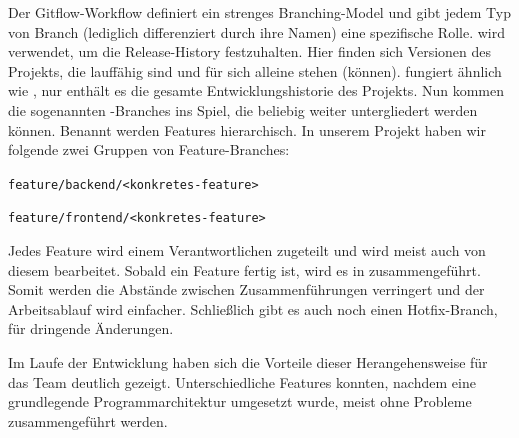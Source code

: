 Der Gitflow-Workflow definiert ein strenges Branching-Model und gibt jedem Typ von Branch (lediglich differenziert durch ihre Namen) eine spezifische Rolle.  wird verwendet, um die Release-History festzuhalten. Hier finden sich Versionen des Projekts, die lauffähig sind und für sich alleine stehen (können).  fungiert ähnlich wie , nur enthält es die gesamte Entwicklungshistorie des Projekts. Nun kommen die sogenannten -Branches ins Spiel, die beliebig weiter untergliedert werden können. Benannt werden Features hierarchisch. In unserem Projekt haben wir folgende zwei Gruppen von Feature-Branches: 

\texttt{feature/backend/<konkretes-feature>}

\texttt{feature/frontend/<konkretes-feature>}

Jedes Feature wird einem Verantwortlichen zugeteilt und wird meist auch von diesem bearbeitet. Sobald ein Feature fertig ist, wird es in  zusammengeführt. Somit werden die Abstände zwischen Zusammenführungen verringert und der Arbeitsablauf wird einfacher. Schließlich gibt es auch noch einen Hotfix-Branch, für dringende Änderungen.

Im Laufe der Entwicklung haben sich die Vorteile dieser Herangehensweise für das Team deutlich gezeigt. Unterschiedliche Features konnten, nachdem eine grundlegende Programmarchitektur umgesetzt wurde, meist ohne Probleme zusammengeführt werden. 